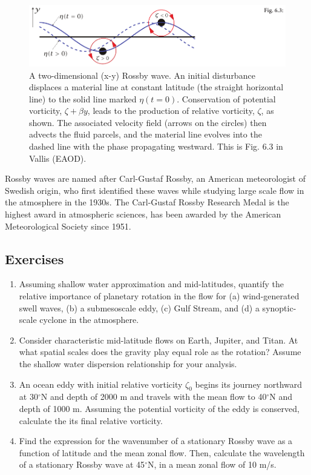 \documentclass[12pt]{article}
\numberwithin{equation}{section}
\numberwithin{figure}{section}
\numberwithin{table}{section}
\begin{document}
\begin{figure}[h]
  \centering
  \includegraphics[width=\textwidth]{assets/fig_rossby_wave.pdf}
  \caption{
    A two-dimensional (x-y) Rossby wave.
    An initial disturbance displaces a material line at constant latitude
    (the straight horizontal line) to the solid line marked $\eta(t=0)$.
    Conservation of potential vorticity, $\zeta + \beta y$, leads to the
    production of relative vorticity, $\zeta$, as shown.
    The associated velocity field (arrows on the circles) then advects the
    fluid parcels, and the material line evolves into the dashed line with
    the phase propagating westward.
    This is Fig. 6.3 in Vallis (EAOD).
  }
  \label{fig:swe_rossby_wave}
\end{figure}

Rossby waves are named after Carl-Gustaf Rossby, an American meteorologist of
Swedish origin, who first identified these waves while studying large scale
flow in the atmosphere in the 1930s.
The Carl-Gustaf Rossby Research Medal is the highest award in atmospheric
sciences, has been awarded by the American Meteorological Society since 1951.

\newpage

\subsection*{Exercises}

\begin{enumerate}
  \item Assuming shallow water approximation and mid-latitudes, quantify the
  relative importance of planetary rotation in the flow for (a) wind-generated
  swell waves, (b) a submesoscale eddy, (c) Gulf Stream, and (d) a synoptic-scale
  cyclone in the atmosphere.
  \item Consider characteristic mid-latitude flows on Earth, Jupiter, and Titan.
  At what spatial scales does the gravity play equal role as the rotation?
  Assume the shallow water dispersion relationship for your analysis.
  \item An ocean eddy with initial relative vorticity $\zeta_0$ begins its
  journey northward at 30$^\circ$N and depth of 2000 m and travels with the
  mean flow to 40$^\circ$N and depth of 1000 m.
  Assuming the potential vorticity of the eddy is conserved, calculate the its
  final relative vorticity.
  \item Find the expression for the wavenumber of a stationary Rossby wave as
  a function of latitude and the mean zonal flow. Then, calculate the wavelength
  of a stationary Rossby wave at 45$^\circ$N, in a mean zonal flow of 10 m/s.
\end{enumerate}
\end{document}
